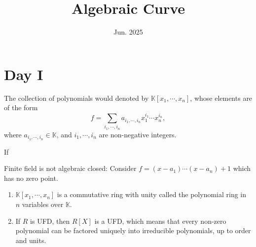 \documentclass[10pt]{article}
\title{\textbf{Algebraic Curve}}
\date{Jun. 2025}
\begin{document}
\maketitle

\section{Day I}

%

\begin{definition}[Polynomial]
  The collection of polynomials would denoted by $ \mathbb{K}[x_1,\cdots ,x_{n}]$, whose elements are of the form
  \begin{equation*}
    f = \sum_{i_1,\cdots ,i_n} a_{i_1,\cdots ,i_n} x_1^{i_1}\cdots x_n^{i_n},
  \end{equation*}
  where $ a_{i_1,\cdots ,i_n} \in \mathbb{K}$, and $ i_1,\cdots ,i_n$ are non-negative integers.
\end{definition}

\begin{definition}
  If
\end{definition}

\begin{remark}
  Finite field is not algebraic closed: Consider $ f = (x - a_{1}) \cdots (x - a_{n}) + 1$ which has no zero point.
\end{remark}

\begin{definition}

\end{definition}

\begin{proposition}
  \begin{enumerate}[(1)]
    \item   $ \mathbb{K}[x_1,\cdots ,x_{n}]$ is a commutative ring with unity called the polynomial ring in $ n$ variables over $ \mathbb{K}$.
    \item If $ R$ is UFD, then $ R[X]$ is a UFD, which means that every non-zero polynomial can be factored uniquely into irreducible polynomials, up to order and units.
  \end{enumerate}
\end{proposition}
\end{document}
